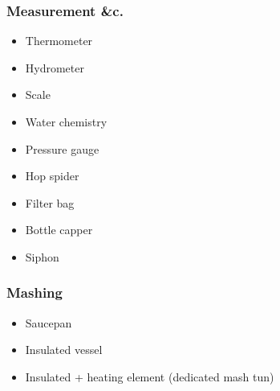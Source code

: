 \documentclass{beamer}
\begin{document}
\begin{frame}
  \frametitle{Measurement \&c.}
  \begin{itemize}
  \item Thermometer
  \item Hydrometer
  \item Scale
    \item Water chemistry
    \item Pressure gauge
    \item Hop spider
    \item Filter bag
    \item Bottle capper
    \item Siphon
  \end{itemize} 
\end{frame}

\begin{frame}
  \frametitle{Mashing}
  \begin{itemize}
  \item Saucepan
  \item Insulated vessel
  \item Insulated + heating element (dedicated mash tun)
  \end{itemize}
\end{frame}
\end{document}
